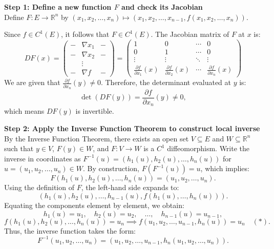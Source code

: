 \begin{pfbox}
\vspace{0.8em}
\noindent \textbf{Step 1: Define a new function $F$ and check its Jacobian}\\
Define $F: E \to \mathbb{R}^n$ by $(x_1, x_2, \ldots, x_n) \mapsto (x_1, x_2, \ldots, x_{n-1}, f(x_1, x_2, \ldots, x_n))$.

Since $f \in C^1(E)$, it follows that $F \in C^1(E)$. The Jacobian matrix of $F$ at $x$ is:
$$ DF(x) = \begin{pmatrix} 
- & \nabla x_1 & - \\ 
- & \nabla x_2 & - \\ 
  & \vdots     &   \\ 
- & \nabla f   & - 
\end{pmatrix} 
= \begin{pmatrix} 
1 & 0 & \cdots & 0 \\ 
0 & 1 & \cdots & 0 \\ 
\vdots & \vdots & \ddots & \vdots \\ 
\frac{\partial f}{\partial x_1}(x) & \frac{\partial f}{\partial x_2}(x) & \cdots & \frac{\partial f}{\partial x_n}(x) 
\end{pmatrix} $$
We are given that $\frac{\partial f}{\partial x_n}(y) \neq 0$. Therefore, the determinant evaluated at $y$ is:
$$ \det(DF(y)) = \frac{\partial f}{\partial x_n}(y) \neq 0, $$
which means $DF(y)$ is invertible.

\vspace{0.8em}
\noindent \textbf{Step 2: Apply the Inverse Function Theorem to construct local inverse}\\
By the Inverse Function Theorem, there exists an open set $V \subseteq E$ and $W \subseteq \mathbb{R}^n$ such that $y \in V$, $F(y) \in W$, and $F: V \to W$ is a $C^1$ diffeomorphism. 
Write the inverse in coordinates as $F^{-1}(u) = (h_1(u), h_2(u), \ldots, h_n(u))$ for $u = (u_1, u_2, \ldots, u_n) \in W$.
By construction, $F(F^{-1}(u)) = u$, which implies:
$$ F(h_1(u), h_2(u), \ldots, h_n(u)) = (u_1, u_2, \ldots, u_n). $$
Using the definition of $F$, the left-hand side expands to:
$$ (h_1(u), h_2(u), \ldots, h_{n-1}(u), f(h_1(u), \ldots, h_n(u))). $$
Equating the components element by element, we obtain:
$$ h_1(u) = u_1, \quad h_2(u) = u_2, \quad \ldots, \quad h_{n-1}(u) = u_{n-1}, $$
$$ f(h_1(u), h_2(u), \ldots, h_n(u)) = u_n \implies f(u_1, u_2, \ldots, u_{n-1}, h_n(u)) = u_n\quad (*).$$
Thus, the inverse function takes the form:
$$ F^{-1}(u_1, u_2, \ldots, u_n) = (u_1, u_2, \ldots, u_{n-1}, h_n(u_1, u_2, \ldots, u_n)). $$


\end{pfbox}
